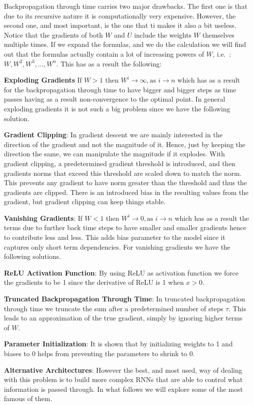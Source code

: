 \vspace{-10pt}

Backpropagation through time carries two major drawbacks. The first one is that due to its recursive nature it is
computationally very expensive. However, the second one, and most important, is the one that ti makes it also a bit
useless. Notice that the gradients of both $W$ and $U$ include the weights $W$ themselves multiple times. If we
expand the formulas, and we do the calculation we will find out that the formulas actually contain a lot of
increasing powers of $W$, i.e.\ : $W, W^2, W^3, \ldots, W^n$. This has as a result the following:
\bit
\item \textbf{Exploding Gradients} If $W > 1$ then $W^i \to \infty, \text{as } i \to n$ which has as a result for
the backpropagation through time to have bigger and bigger steps as time passes having as a result non-convergence to
the optimal point. In general exploding gradients it is not such a big problem since we have the following solution.
\bit
\item \textbf{Gradient Clipping}: In gradient descent we are mainly interested in the direction of the gradient and
not the magnitude of it. Hence, just by keeping the direction the same, we can manipulate the magnitude if it
explodes. With gradient clipping, a predetermined gradient threshold is introduced, and then gradients norms that
exceed this threshold are scaled down to match the norm. This prevents any gradient to have norm greater than the
threshold and thus the gradients are clipped. There is an introduced bias in the resulting values from the gradient,
but gradient clipping can keep things stable.
\eit
\item \textbf{Vanishing Gradients}: If $W < 1$ then $W^i \to 0, \text{as } i \to n$ which has as a result the terms
due to further back time steps to have smaller and smaller gradients hence to contribute less and less. This adds
bias parameter to the model since it captures only short term dependencies. For vanishing gradients we have the
following solutions. \bit \item \textbf{ReLU Activation Function}: By using ReLU as activation function we force the
gradients to be 1 since the derivative of ReLU is 1 when $x>0$.
\item \textbf{Truncated Backpropagation Through Time}: In truncated backpropagation through time we truncate the sum
after a predetermined number of steps $\tau$. This leads to an approximation of the true gradient, simply by ignoring
higher terms of $W$.
\item \textbf{Parameter Initialization}: It is shown that by initializing weights to 1 and biases to 0 helps from
preventing the parameters to shrink to 0.
\item \textbf{Alternative Architectures}: However the best, and most used, way of dealing with this problem is to
build more complex RNNs that are able to control what information is passed through. In what follows we will explore
some of the most famous of them.
\eit
\eit

